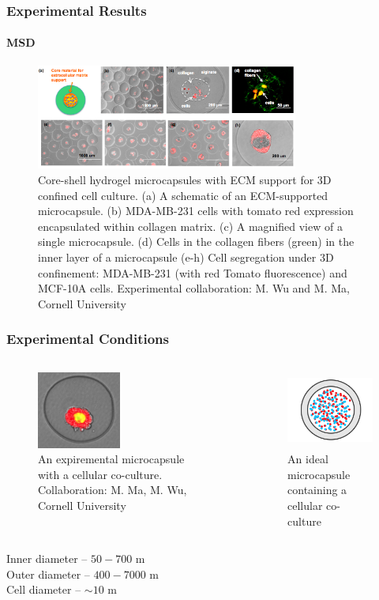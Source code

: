 \documentclass{beamer}
\begin{document}
  \begin{frame}
    \frametitle{Experimental Results}
    \framesubtitle{MSD}
    \begin{figure}
    \includegraphics[width=3.4in]{MMaMWufig.png}
    \caption{Core-shell hydrogel microcapsules with ECM support for 3D confined cell culture. (a) A schematic of an ECM-supported microcapsule. (b) MDA-MB-231 cells with tomato red expression encapsulated within collagen matrix. (c) A magnified view of a single microcapsule. (d) Cells in the collagen fibers (green) in the inner layer of a microcapsule (e-h) Cell segregation under 3D confinement: MDA-MB-231 (with red Tomato fluorescence) and MCF-10A cells.
Experimental collaboration: M. Wu and M. Ma, Cornell University}
    \end{figure}
    \vfill
  \end{frame}
    
  \begin{frame}
    \frametitle{Experimental Conditions}
  	\begin{columns}[t] 
  	\begin{figure}
  	  \includegraphics[height=1.0in]{minglin.png}
  	  \caption{An expiremental microcapsule with a cellular co-culture.
Collaboration: M. Ma, M. Wu, Cornell University}
  	\end{figure}
    \begin{figure}
      \includegraphics[height=1.0in]{Fig1.png}
      \caption{An ideal microcapsule containing a cellular co-culture}
    \end{figure}
    \end{columns}
    \begin{centering}
    Inner diameter -- $50-700$ \textmu m\\
    Outer diameter -- $400-7000$ \textmu m\\
	  Cell diameter -- $\sim 10$ \textmu m\\
    \end{centering}
    \vfill
  \end{frame}
\end{document}
